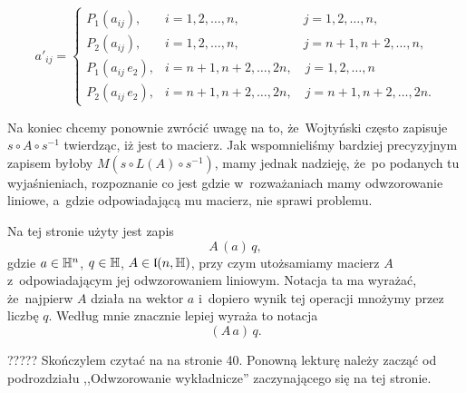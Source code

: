 \documentclass[a4paper,11pt]{article}
\begin{document}
\begin{equation}
  \label{eq:Wojtynski-97}
  a'_{ i j } =
  \begin{cases}
    P_{ 1 }( a_{ i j } ), &i = 1, 2, \ldots, n, \qquad \qquad \quad
                            j = 1, 2, \ldots, n, \\
    P_{ 2 }( a_{ i j } ), &i = 1, 2, \ldots, n, \qquad \qquad \quad
                            j = n + 1, n + 2, \ldots, n, \\
    P_{ 1 }( a_{ i j } \, e_{ 2 } ), &i = n + 1, n + 2, \ldots, 2n, \quad
                                       j = 1, 2, \ldots, n \\
    P_{ 2 }( a_{ i j } \, e_{ 2 } ), &i = n + 1, n + 2, \ldots, 2n, \quad
                                       j = n + 1, n + 2, \ldots, 2n.
  \end{cases}
\end{equation}

Na koniec chcemy ponownie zwrócić uwagę na to, że~Wojtyński często zapisuje
$s \circ A \circ s^{ -1 }$ twierdząc, iż jest to macierz. Jak wspomnieliśmy bardziej
precyzyjnym zapisem byłoby $M\!( s \circ L( A ) \circ s^{ -1 } )$, mamy jednak
nadzieję, że~po podanych tu wyjaśnieniach, rozpoznanie co jest gdzie
w~rozważaniach mamy odwzorowanie liniowe, a~gdzie odpowiadającą mu macierz,
nie sprawi problemu.

\vspace{\spaceFour}





 Na tej stronie użyty jest zapis
\begin{equation}
  \label{eq:Wojtynski-98}
  A \, ( a ) \, q,
\end{equation}
gdzie $a \in \mathbb{H}^{ n }$, $q \in \mathbb{H}$, $A \in \mathfrak{l}( n, \mathbb{H} )$, przy czym
utożsamiamy macierz $A$ z~odpowiadającym jej odwzorowaniem liniowym.
Notacja ta ma wyrażać, że~najpierw $A$ działa na wektor $a$ i~dopiero wynik
tej operacji mnożymy przez liczbę $q$. Według mnie znacznie lepiej wyraża
to notacja
\begin{equation}
  \label{eq:Wojtynski-99}
  ( A \, a ) \, q.
\end{equation}





????? Skończylem czytać na na stronie 40. Ponowną lekturę należy zacząć od podrozdziału ,,Odwzorowanie wykładnicze''
zaczynającego się na tej stronie.
\end{document}
